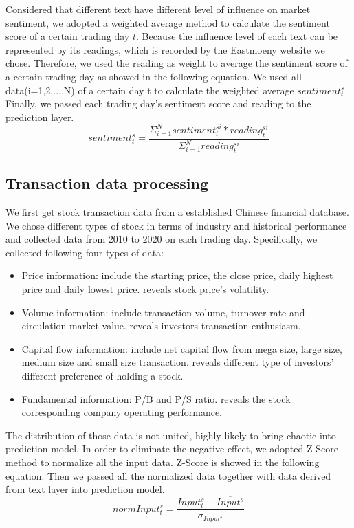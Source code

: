 \documentclass[runningheads]{llncs}
\begin{document}
Considered that different text have different level of influence on market sentiment, we adopted a weighted average method to calculate the sentiment score of a certain trading day $t$. Because the influence level of each text can be represented by its readings, which is recorded by the Eastmoeny website we chose. Therefore, we used the reading as weight to average the sentiment score of a certain trading day as showed in the following equation. We used all data(i=1,2,...,N) of a certain day t to calculate the weighted average $sentiment_t^s$. Finally, we passed each trading day's sentiment score and reading to the prediction layer.
\begin{equation}
    sentiment_t^s = \frac{\Sigma_{i=1}^{N}sentiment_t^{si}*reading_t^{si}}{\Sigma_{i=1}^Nreading_t^{si}}
\end{equation}

\subsection{Transaction data processing}
We first get stock transaction data from a established Chinese financial database. We chose different types of stock in terms of industry and historical performance and collected data from 2010 to 2020 on each trading day. Specifically, we collected following four types of data:
\begin{itemize}
    \item Price information: include the starting price, the close price, daily highest price and daily lowest price. reveals stock price's volatility.
    \item Volume information: include transaction volume, turnover rate and circulation market value. reveals investors transaction enthusiasm.
    \item Capital flow information: include net capital flow from mega size, large size, medium size and small size transaction. reveals different type of investors' different preference of holding a stock.
    \item Fundamental information: P/B and P/S ratio. reveals the stock corresponding company operating performance.
\end{itemize}

The distribution of those data is not united, highly likely to bring chaotic into prediction model. In order to eliminate the negative effect, we adopted Z-Score method to normalize all the input data. Z-Score is showed in the following equation. Then we passed all the normalized data together with data derived from text layer into prediction model.
\begin{equation}
    normInput_t^s = \frac{Input_t^s-\overline{Input^s}}{\sigma_{Input^s}}
\end{equation}
\end{document}
